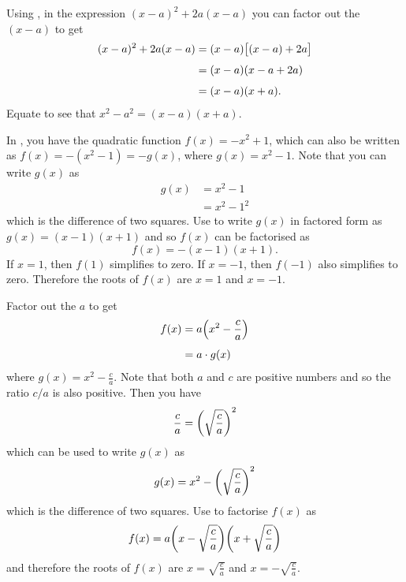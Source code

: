 \documentclass[a4paper,oneside,12pt]{article}
\begin{document}
\begin{problem}
{\begin{solution}
Using , in the
expression $(x - a)^2 + 2a(x - a)$ you can factor out the $(x - a)$ to
get
\begin{equation}
\label{eqn:difference_two_squares_factorised}
\begin{aligned}
(x - a)^2 + 2a(x - a)
&=
(x - a) \bigsquare{(x - a) + 2a} \\[4pt]
&=
(x - a) (x - a + 2a) \\[4pt]
&=
(x - a) (x + a).
\end{aligned}
\end{equation}
Equate
to see that $x^2 - a^2 = (x - a) (x + a)$.

In , you have the quadratic function
$f(x) = -x^2 + 1$, which can also be written as
$f(x) = -(x^2 - 1) = -g(x)$, where $g(x) = x^2 - 1$.  Note that you
can write $g(x)$ as
\begin{align*}
g(x)
&=
x^2 - 1 \\[4pt]
&=
x^2 - 1^2
\end{align*}
which is the difference of two squares.
Use  to write $g(x)$ in
factored form as $g(x) = (x - 1) (x + 1)$ and so $f(x)$ can be
factorised as
\[
f(x)
=
-(x - 1) (x + 1).
\]
If $x = 1$, then $f(1)$ simplifies to zero.  If $x = -1$, then $f(-1)$
also simplifies to zero.  Therefore the roots of $f(x)$ are $x = 1$
and $x = -1$.

Factor out the $a$ to get
\begin{align*}
f(x)
&=
a
\parenthesis*{
  x^2 - \frac{c}{a}
} \\[4pt]
&=
a \cdot g(x)
\end{align*}
where $g(x) = x^2 - \frac{c}{a}$.  Note that both $a$ and $c$ are
positive numbers and so the ratio $c / a$ is also positive.  Then you
have
\[
\frac{c}{a}
=
\parenthesis*{
  \sqrt{
    \frac{c}{a}
  }
}^2
\]
which can be used to write $g(x)$ as
\[
g(x)
=
x^2
-
\parenthesis*{
  \sqrt{
    \frac{c}{a}
  }
}^2
\]
which is the difference of two squares.
Use  to factorise $f(x)$
as
\[
f(x)
=
a
\parenthesis*{
  x - \sqrt{\frac{c}{a}}
}
\parenthesis*{
  x + \sqrt{\frac{c}{a}}
}
\]
and therefore the roots of $f(x)$ are $x = \sqrt{\frac{c}{a}}$ and
$x = -\sqrt{\frac{c}{a}}$.
\end{solution}
}{}


\end{problem}
\end{document}
